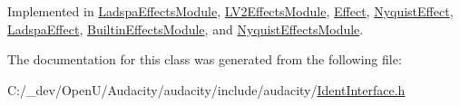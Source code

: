 Implemented in \hyperlink{class_ladspa_effects_module_aff740ff07423307352d63905a52468e3}{Ladspa\+Effects\+Module}, \hyperlink{class_l_v2_effects_module_a602815e15fbf034ec760336ced31e302}{L\+V2\+Effects\+Module}, \hyperlink{class_effect_aa7da4a49885d4ee039a5e4a00dfde6ca}{Effect}, \hyperlink{class_nyquist_effect_a6c44dfb61e1120a907120f559dea4c84}{Nyquist\+Effect}, \hyperlink{class_ladspa_effect_ac26d59065f2d9ecd9839ba0d5d9f100b}{Ladspa\+Effect}, \hyperlink{class_builtin_effects_module_ae4f3ba236d1c3aea9f05527cee8dc9db}{Builtin\+Effects\+Module}, and \hyperlink{class_nyquist_effects_module_a87a0ea8bb78163db15749ca7c7f039e6}{Nyquist\+Effects\+Module}.



The documentation for this class was generated from the following file\+:\begin{DoxyCompactItemize}
\item 
C\+:/\+\_\+dev/\+Open\+U/\+Audacity/audacity/include/audacity/\hyperlink{_ident_interface_8h}{Ident\+Interface.\+h}\end{DoxyCompactItemize}

